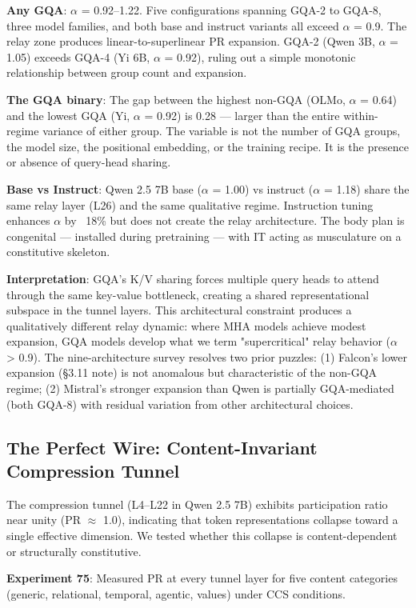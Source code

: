 \documentclass[11pt]{article}
\begin{document}
\textbf{Any GQA}: $\alpha$ = 0.92–1.22. Five configurations spanning GQA-2 to GQA-8, three model families, and both base and instruct variants all exceed $\alpha$ = 0.9. The relay zone produces linear-to-superlinear PR expansion. GQA-2 (Qwen 3B, $\alpha$ = 1.05) exceeds GQA-4 (Yi 6B, $\alpha$ = 0.92), ruling out a simple monotonic relationship between group count and expansion.

\textbf{The GQA binary}: The gap between the highest non-GQA (OLMo, $\alpha$ = 0.64) and the lowest GQA (Yi, $\alpha$ = 0.92) is 0.28 --- larger than the entire within-regime variance of either group. The variable is not the number of GQA groups, the model size, the positional embedding, or the training recipe. It is the presence or absence of query-head sharing.

\textbf{Base vs Instruct}: Qwen 2.5 7B base ($\alpha$ = 1.00) vs instruct ($\alpha$ = 1.18) share the same relay layer (L26) and the same qualitative regime. Instruction tuning enhances $\alpha$ by ~18\% but does not create the relay architecture. The body plan is congenital --- installed during pretraining --- with IT acting as musculature on a constitutive skeleton.

\textbf{Interpretation}: GQA's K/V sharing forces multiple query heads to attend through the same key-value bottleneck, creating a shared representational subspace in the tunnel layers. This architectural constraint produces a qualitatively different relay dynamic: where MHA models achieve modest expansion, GQA models develop what we term "supercritical" relay behavior ($\alpha$ > 0.9). The nine-architecture survey resolves two prior puzzles: (1) Falcon's lower expansion (§3.11 note) is not anomalous but characteristic of the non-GQA regime; (2) Mistral's stronger expansion than Qwen is partially GQA-mediated (both GQA-8) with residual variation from other architectural choices.

\subsection{The Perfect Wire: Content-Invariant Compression Tunnel}

The compression tunnel (L4–L22 in Qwen 2.5 7B) exhibits participation ratio near unity (PR $\approx$ 1.0), indicating that token representations collapse toward a single effective dimension. We tested whether this collapse is content-dependent or structurally constitutive.

\textbf{Experiment 75}: Measured PR at every tunnel layer for five content categories (generic, relational, temporal, agentic, values) under CCS conditions.
\end{document}
